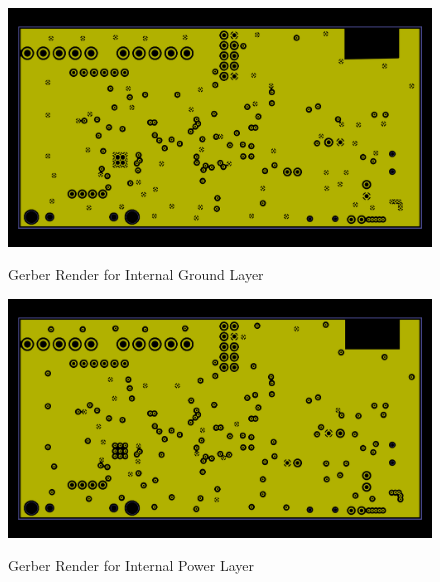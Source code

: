 \begin{figure}
\begin{center}
	\label{fig:GNDGerber}
	\includegraphics[angle=0,scale=1,width=.95\textwidth]{Images/Rev5_GNDGERB.png} 
	\caption{Gerber Render for Internal Ground Layer}
\end{center}
\end{figure}


\begin{figure}
\begin{center}
	\label{fig:PWRGerber}
	\includegraphics[angle=0,scale=1,width=.95\textwidth]{Images/Rev5_PWRGERB.png} 
	\caption{Gerber Render for Internal Power Layer}
\end{center}
\end{figure}


\newcommand{\putOversized}[7]{
\ifnum1=#6\relax
	\raggedright\noindent\bfseries\Large Appendix \ref{#1} (Cont.) \par
\fi
	\raggedright\fbox{\texttt{[image: \#2]}}
	
\ifnum1=#4\relax
	\normalfont\normalsize \parbox{#7}{\raggedleft(cont. on next page)} \par
\fi
\raggedright\clearpage
}

